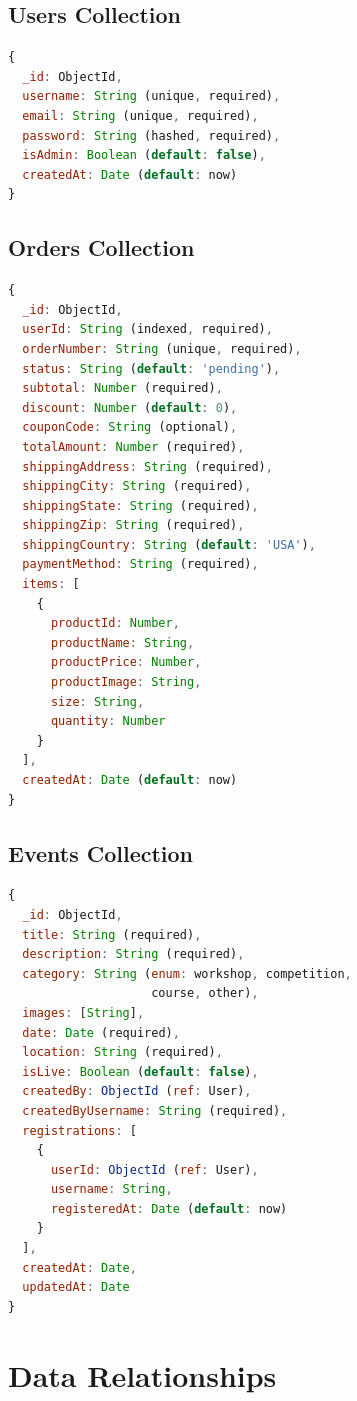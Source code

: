 \documentclass{scrreprt}
\begin{document}
\subsection{Users Collection}
\begin{lstlisting}[language=JavaScript]
{
  _id: ObjectId,
  username: String (unique, required),
  email: String (unique, required),
  password: String (hashed, required),
  isAdmin: Boolean (default: false),
  createdAt: Date (default: now)
}
\end{lstlisting}

\subsection{Orders Collection}
\begin{lstlisting}[language=JavaScript]
{
  _id: ObjectId,
  userId: String (indexed, required),
  orderNumber: String (unique, required),
  status: String (default: 'pending'),
  subtotal: Number (required),
  discount: Number (default: 0),
  couponCode: String (optional),
  totalAmount: Number (required),
  shippingAddress: String (required),
  shippingCity: String (required),
  shippingState: String (required),
  shippingZip: String (required),
  shippingCountry: String (default: 'USA'),
  paymentMethod: String (required),
  items: [
    {
      productId: Number,
      productName: String,
      productPrice: Number,
      productImage: String,
      size: String,
      quantity: Number
    }
  ],
  createdAt: Date (default: now)
}
\end{lstlisting}

\subsection{Events Collection}
\begin{lstlisting}[language=JavaScript]
{
  _id: ObjectId,
  title: String (required),
  description: String (required),
  category: String (enum: workshop, competition, 
                    course, other),
  images: [String],
  date: Date (required),
  location: String (required),
  isLive: Boolean (default: false),
  createdBy: ObjectId (ref: User),
  createdByUsername: String (required),
  registrations: [
    {
      userId: ObjectId (ref: User),
      username: String,
      registeredAt: Date (default: now)
    }
  ],
  createdAt: Date,
  updatedAt: Date
}
\end{lstlisting}

\section{Data Relationships}
\end{document}
